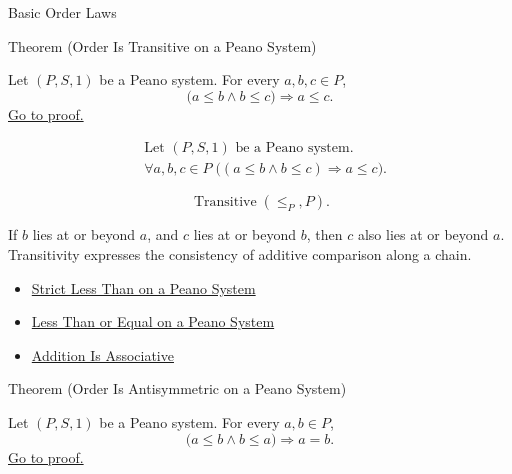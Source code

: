 \begin{topicbox}{Basic Order Laws}
\begin{theorembox}{Theorem (Order Is Transitive on a Peano System)}
\begin{theorem}
\label{thm:order-transitive-on-peano-system}
Let $(P,S,1)$ be a Peano system. For every $a,b,c \in P$,
\[
\bigl(a \le b \land b \le c\bigr)
\Longrightarrow
a \le c.
\]
\hyperref[prf:order-transitive-on-peano-system]{Go to proof.}
\end{theorem}
\end{theorembox}

\begin{remark*}
\[
\begin{aligned}
&\text{Let } (P,S,1) \text{ be a Peano system.}\\
&\forall a,b,c \in P\;
\bigl((a \le b \land b \le c) \Longrightarrow a \le c\bigr).
\end{aligned}
\]
\end{remark*}

\begin{remark*}
\[
\operatorname{Transitive}(\leq_P,P).
\]
\end{remark*}

\begin{remark*}[Interpretation]
If $b$ lies at or beyond $a$, and $c$ lies at or beyond $b$, then $c$ also
lies at or beyond $a$. Transitivity expresses the consistency of additive
comparison along a chain.
\end{remark*}

\begin{dependencies}
\begin{itemize}
  \item \hyperref[def:strict-less-than-on-peano-system]{Strict Less Than on a Peano System}
  \item \hyperref[def:less-than-or-equal-on-peano-system]{Less Than or Equal on a Peano System}
  \item \hyperref[thm:addition-associative]{Addition Is Associative}
\end{itemize}
\end{dependencies}

\begin{theorembox}{Theorem (Order Is Antisymmetric on a Peano System)}
\begin{theorem}
\label{thm:order-antisymmetric-on-peano-system}
Let $(P,S,1)$ be a Peano system. For every $a,b \in P$,
\[
\bigl(a \le b \land b \le a\bigr)
\Longrightarrow
a=b.
\]
\hyperref[prf:order-antisymmetric-on-peano-system]{Go to proof.}
\end{theorem}
\end{theorembox}


\end{topicbox}
